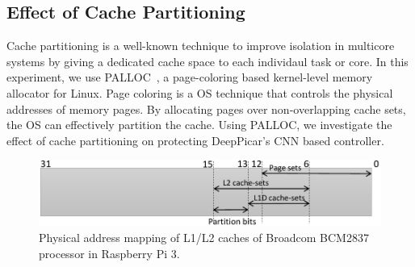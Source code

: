 \subsection{Effect of Cache Partitioning}





Cache partitioning is a well-known technique to improve isolation in
multicore systems by giving a dedicated cache space to each individaul 
task or core. In this experiment, we use PALLOC~\cite{yun2014rtas}, a
page-coloring based kernel-level memory allocator for Linux.
Page coloring is a OS technique that controls the physical addresses
of memory pages. By allocating pages over non-overlapping cache sets,
the OS can effectively partition the cache.
Using PALLOC, we investigate the effect of cache partitioning on
protecting DeepPicar's CNN based controller.

\begin{figure} [h]
  \centering
  \includegraphics[width=.5\textwidth]{figs/cache-mapping}
  \caption{Physical address mapping of L1/L2 caches of Broadcom
    BCM2837 processor in Raspberry Pi 3.}
  \label{fig:cache-mapping}
\end{figure}

